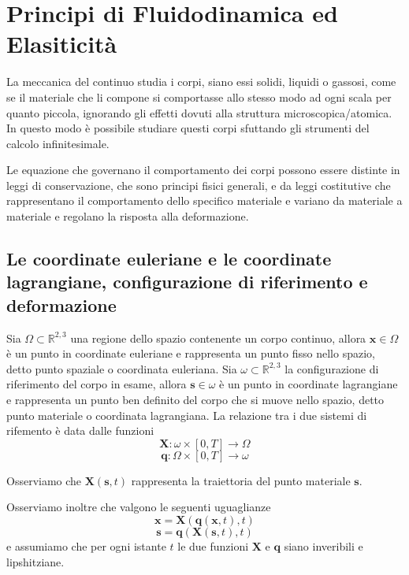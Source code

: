 
\chapter{Principi di Fluidodinamica ed Elasiticità}
La meccanica del continuo studia i corpi, siano essi solidi, liquidi o gassosi, come se il materiale che li compone si comportasse allo stesso modo ad ogni scala per quanto piccola, ignorando gli effetti dovuti alla struttura microscopica/atomica. In questo modo è possibile studiare questi corpi sfuttando gli strumenti del calcolo infinitesimale.

Le equazione che governano il comportamento dei corpi possono essere distinte in leggi di conservazione, che sono principi fisici generali, e da leggi costitutive che rappresentano il comportamento dello specifico materiale e variano da materiale a materiale e regolano la risposta alla deformazione.

\section{Le coordinate euleriane e le coordinate lagrangiane, configurazione di riferimento e deformazione}
Sia $\Omega \subset \mathbb{R}^{2,3}$ una regione dello spazio contenente un corpo continuo, allora $\mathbf{x} \in \Omega$ è un punto in coordinate euleriane e rappresenta un punto fisso nello spazio, detto punto spaziale o coordinata euleriana. 
Sia $\omega \subset \mathbb{R}^{2,3}$ la configurazione di riferimento del corpo in esame, allora $\mathbf{s} \in \omega$ è un punto in coordinate lagrangiane e rappresenta un punto ben definito del corpo che si muove nello spazio, detto punto materiale o coordinata lagrangiana.
La relazione tra i due sistemi di rifemento è data dalle funzioni
\begin{equation*}  
\mathbf{X}:\omega \times [0,T] \to \Omega
\end{equation*}
\begin{equation*}  
\mathbf{q}:\Omega \times [0,T] \to \omega
\end{equation*}

Osserviamo che $\mathbf{X}(\mathbf{s},t)$ rappresenta la traiettoria del punto materiale $\mathbf{s}$.

Osserviamo inoltre che valgono le seguenti uguaglianze
\begin{equation*}  
\mathbf{x} = \mathbf{X}(\mathbf{q}(\mathbf{x},t),t)
\end{equation*}
\begin{equation*}  
\mathbf{s} = \mathbf{q}(\mathbf{X}(\mathbf{s},t),t)
\end{equation*}
e assumiamo che per ogni istante $t$ le due funzioni $\mathbf{X}$ e $\mathbf{q}$ siano inveribili e lipshitziane.

